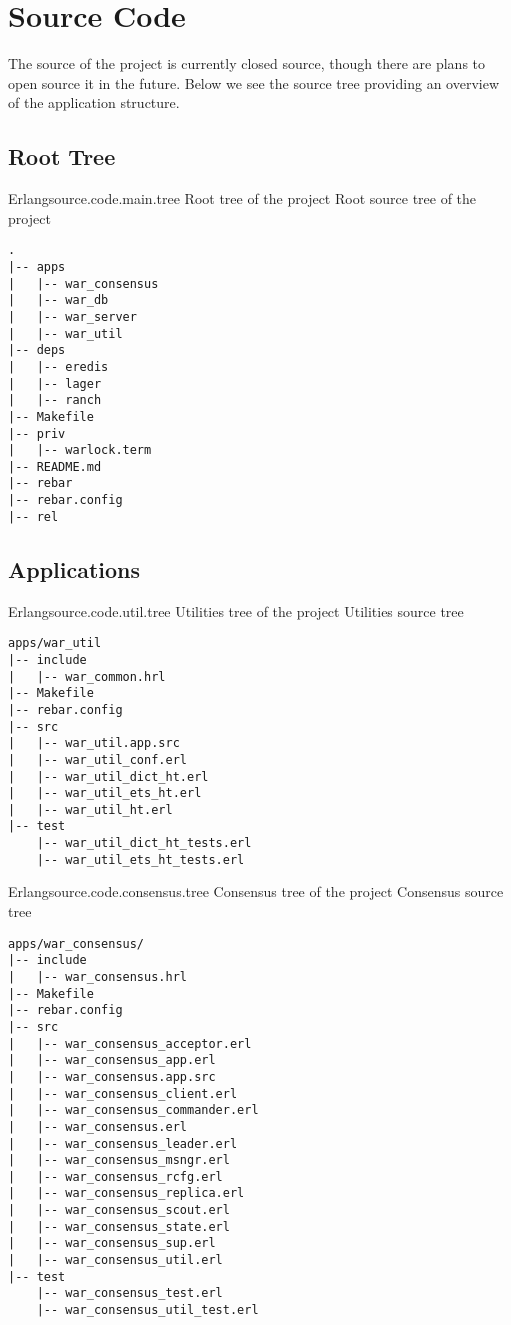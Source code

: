 ﻿\chapter{Source Code}
\label{chapter:source.code}

The source of the project is currently closed source, though there are plans
to open source it in the future. Below we see the source tree providing
an overview of the application structure.

\section{Root Tree}

\begin{scode}{Erlang}{source.code.main.tree}{%
  Root tree of the project}{%
  Root source tree of the project}
  \begin{lstlisting}
.
|-- apps
|   |-- war_consensus
|   |-- war_db
|   |-- war_server
|   |-- war_util
|-- deps
|   |-- eredis
|   |-- lager
|   |-- ranch
|-- Makefile
|-- priv
|   |-- warlock.term
|-- README.md
|-- rebar
|-- rebar.config
|-- rel

  \end{lstlisting}
\end{scode}

\section{Applications}

\begin{scode}{Erlang}{source.code.util.tree}{%
  Utilities tree of the project}{%
  Utilities source tree}
  \begin{lstlisting}
apps/war_util
|-- include
|   |-- war_common.hrl
|-- Makefile
|-- rebar.config
|-- src
|   |-- war_util.app.src
|   |-- war_util_conf.erl
|   |-- war_util_dict_ht.erl
|   |-- war_util_ets_ht.erl
|   |-- war_util_ht.erl
|-- test
    |-- war_util_dict_ht_tests.erl
    |-- war_util_ets_ht_tests.erl

  \end{lstlisting}
\end{scode}

\begin{scode}{Erlang}{source.code.consensus.tree}{%
  Consensus tree of the project}{%
  Consensus source tree}
  \begin{lstlisting}
apps/war_consensus/
|-- include
|   |-- war_consensus.hrl
|-- Makefile
|-- rebar.config
|-- src
|   |-- war_consensus_acceptor.erl
|   |-- war_consensus_app.erl
|   |-- war_consensus.app.src
|   |-- war_consensus_client.erl
|   |-- war_consensus_commander.erl
|   |-- war_consensus.erl
|   |-- war_consensus_leader.erl
|   |-- war_consensus_msngr.erl
|   |-- war_consensus_rcfg.erl
|   |-- war_consensus_replica.erl
|   |-- war_consensus_scout.erl
|   |-- war_consensus_state.erl
|   |-- war_consensus_sup.erl
|   |-- war_consensus_util.erl
|-- test
    |-- war_consensus_test.erl
    |-- war_consensus_util_test.erl
  \end{lstlisting}
\end{scode}


